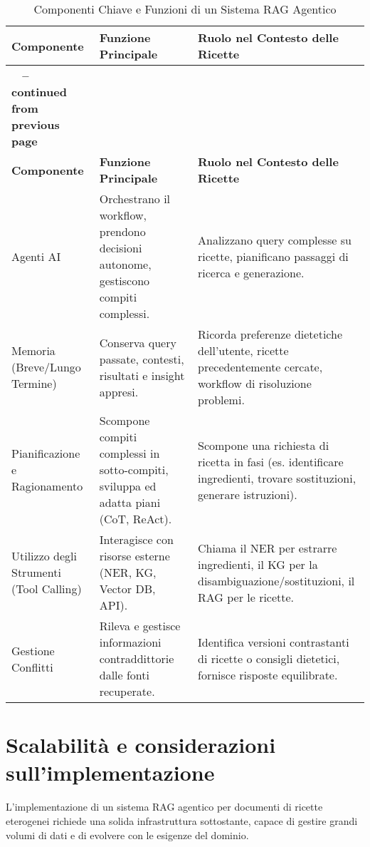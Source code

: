 \documentclass[a4paper, 11pt]{article}
\begin{document}
\begin{longtable}{>{\raggedright\arraybackslash}p{4cm} >{\raggedright\arraybackslash}p{6cm} >{\raggedright\arraybackslash}p{6cm}}
\caption{Componenti Chiave e Funzioni di un Sistema RAG Agentico}\\
\toprule
\textbf{Componente} & \textbf{Funzione Principale} & \textbf{Ruolo nel Contesto delle Ricette} \\
\midrule
\endfirsthead
\multicolumn{3}{c}%
{{\bfseries \tablename\ \thetable{} -- continued from previous page}} \\
\toprule
\textbf{Componente} & \textbf{Funzione Principale} & \textbf{Ruolo nel Contesto delle Ricette} \\
\midrule
\endhead
\bottomrule
\endfoot
Agenti AI \cite{what_is_agentic_rag_ibm} & Orchestrano il workflow, prendono decisioni autonome, gestiscono compiti complessi. & Analizzano query complesse su ricette, pianificano passaggi di ricerca e generazione. \\
\addlinespace
Memoria (Breve/Lungo Termine) \cite{what_is_agentic_rag_ibm} & Conserva query passate, contesti, risultati e insight appresi. & Ricorda preferenze dietetiche dell'utente, ricette precedentemente cercate, workflow di risoluzione problemi. \\
\addlinespace
Pianificazione e Ragionamento \cite{what_is_agentic_rag_ibm} & Scompone compiti complessi in sotto-compiti, sviluppa ed adatta piani (CoT, ReAct). & Scompone una richiesta di ricetta in fasi (es. identificare ingredienti, trovare sostituzioni, generare istruzioni). \\
\addlinespace
Utilizzo degli Strumenti (Tool Calling) \cite{what_is_agentic_rag_ibm} & Interagisce con risorse esterne (NER, KG, Vector DB, API). & Chiama il NER per estrarre ingredienti, il KG per la disambiguazione/sostituzioni, il RAG per le ricette. \\
\addlinespace
Gestione Conflitti \cite{dragged_into_conflicts} & Rileva e gestisce informazioni contraddittorie dalle fonti recuperate. & Identifica versioni contrastanti di ricette o consigli dietetici, fornisce risposte equilibrate. \\
\end{longtable}

\section{Scalabilità e considerazioni sull'implementazione}
L'implementazione di un sistema RAG agentico per documenti di ricette eterogenei richiede una solida infrastruttura sottostante, capace di gestire grandi volumi di dati e di evolvere con le esigenze del dominio.
\end{document}
